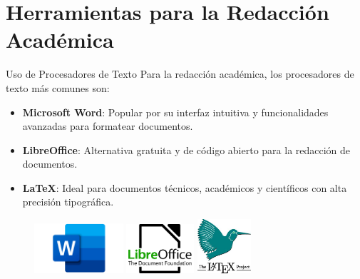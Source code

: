 \documentclass[
11pt, %
]{beamer}
\begin{document}
\section{Herramientas para la Redacción Académica}


\begin{frame}{Uso de Procesadores de Texto}
	Para la redacción académica, los procesadores de texto más comunes son:
	\begin{itemize}
		\item \textbf{Microsoft Word}: Popular por su interfaz intuitiva y funcionalidades avanzadas para formatear documentos.
		\item \textbf{LibreOffice}: Alternativa gratuita y de código abierto para la redacción de documentos.
		\item \textbf{LaTeX}: Ideal para documentos técnicos, académicos y científicos con alta precisión tipográfica.
	\end{itemize}
	\vspace{0.5cm} %
	\begin{figure}[h!]
		\centering
		\includegraphics[width=3.3cm]{microsoftword logo.png}
		\hspace{0.5cm} %
		\includegraphics[width=2.5cm]{libreoffice logo.png}
		\hspace{0.5cm} %
		\includegraphics[width=2cm]{latex_logo.jpeg}
	\end{figure}
\end{frame}
\end{document}

